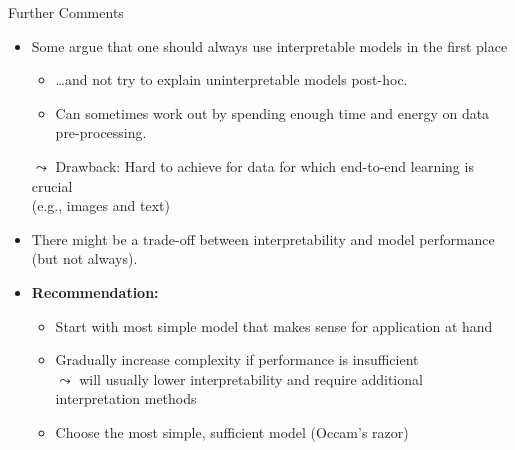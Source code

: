 \documentclass[11pt,compress,t,notes=noshow, aspectratio=169, xcolor=table]{beamer}
\begin{document}
\begin{frame}{Further Comments}

    \begin{itemize}
    \itemsep1em
        \item Some argue that one should always use interpretable models in the first place 
        \begin{itemize}
            \item \ldots and not try to explain uninterpretable models post-hoc.
            \item Can sometimes work out by spending enough time and energy on data pre-processing. %
        \end{itemize}
        \pause
       \item[$\leadsto$] Drawback: Hard to achieve for data for which end-to-end learning is crucial\\ (e.g., images and text)
        \pause
        \item There might be a trade-off between interpretability and model performance (but not always).
        \pause
        \item \textbf{Recommendation:}
        \begin{itemize}
            \item Start with most simple model that makes sense for application at hand
            \item Gradually increase complexity if performance is insufficient\\
            $\leadsto$ will usually lower interpretability and require additional interpretation methods
            \item Choose the most simple, sufficient model (Occam's razor)
        \end{itemize} 
    \end{itemize}

\end{frame}


\endlecture
\end{document}
